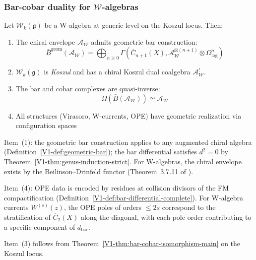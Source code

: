 \subsubsection{Bar-cobar duality for $\mathcal{W}$-algebras}

\begin{theorem}\label{thm:w-algebra-bar-cobar-package}
Let $\mathcal{W}_k(\mathfrak{g})$ be a W-algebra at generic level on
the Koszul locus. Then:
\begin{enumerate}
\item The chiral envelope $\mathcal{A}_{\mathcal{W}}$ admits geometric bar
 construction:
 \[\bar{B}^{\text{geom}}(\mathcal{A}_{\mathcal{W}}) = \bigoplus_{n \geq 0}
 \Gamma\left(\overline{C}_{n+1}(X), \mathcal{A}_{\mathcal{W}}^{\boxtimes(n+1)}
 \otimes \Omega^n_{\log}\right)\]

\item $\mathcal{W}_k(\mathfrak{g})$ is \emph{Koszul} and has a chiral
 Koszul dual coalgebra $\mathcal{A}_{\mathcal{W}}^!$.

\item The bar and cobar complexes are quasi-inverse:
 \[\Omega(\bar{B}(\mathcal{A}_{\mathcal{W}})) \simeq \mathcal{A}_{\mathcal{W}}\]

\item All structures (Virasoro, W-currents, OPE) have geometric realization via
 configuration spaces
\end{enumerate}
\end{theorem}

\begin{remark}
Item~(1): the geometric bar construction applies to any augmented chiral algebra
(Definition~\ref*{V1-def:geometric-bar}); the bar differential satisfies
$d^2 = 0$ by Theorem~\ref*{V1-thm:genus-induction-strict}. For W-algebras,
the chiral envelope exists by the Beilinson--Drinfeld functor
(Theorem~3.7.11 of \cite{BD04}).

Item~(4): OPE data is encoded by residues at collision divisors of the
FM compactification (Definition~\ref*{V1-def:bar-differential-complete}).
For W-algebra currents $W^{(s)}(z)$, the OPE poles of orders
$\leq 2s$ correspond to the stratification of $\overline{C}_2(X)$
along the diagonal, with each pole order contributing to a specific
component of $d_{\mathrm{bar}}$.

Item~(3) follows from
Theorem~\ref*{V1-thm:bar-cobar-isomorphism-main} on the Koszul locus.
\end{remark}


